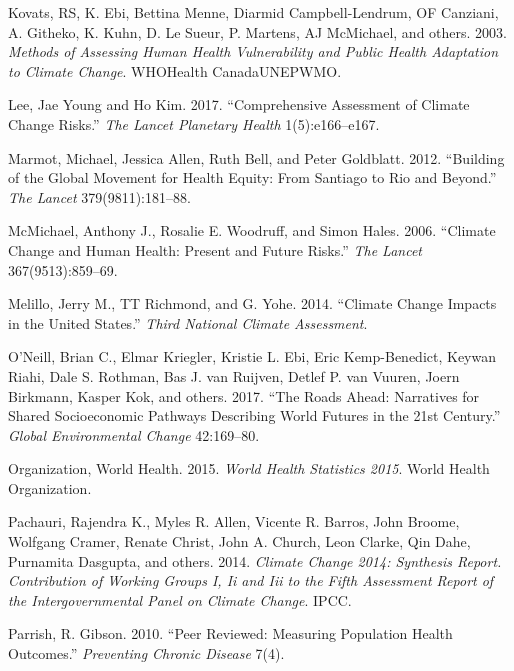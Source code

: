 \documentclass[12pt,]{article}
\begin{document}
\leavevmode\hypertarget{ref-kovats2003methods}{}%
Kovats, RS, K. Ebi, Bettina Menne, Diarmid Campbell-Lendrum, OF
Canziani, A. Githeko, K. Kuhn, D. Le Sueur, P. Martens, AJ McMichael,
and others. 2003. \emph{Methods of Assessing Human Health Vulnerability
and Public Health Adaptation to Climate Change}. WHOHealth
CanadaUNEPWMO.

\leavevmode\hypertarget{ref-lee2017comprehensive}{}%
Lee, Jae Young and Ho Kim. 2017. ``Comprehensive Assessment of Climate
Change Risks.'' \emph{The Lancet Planetary Health} 1(5):e166--e167.

\leavevmode\hypertarget{ref-marmot2012building}{}%
Marmot, Michael, Jessica Allen, Ruth Bell, and Peter Goldblatt. 2012.
``Building of the Global Movement for Health Equity: From Santiago to
Rio and Beyond.'' \emph{The Lancet} 379(9811):181--88.

\leavevmode\hypertarget{ref-mcmichael2006climate}{}%
McMichael, Anthony J., Rosalie E. Woodruff, and Simon Hales. 2006.
``Climate Change and Human Health: Present and Future Risks.'' \emph{The
Lancet} 367(9513):859--69.

\leavevmode\hypertarget{ref-melillo2014climate}{}%
Melillo, Jerry M., TT Richmond, and G. Yohe. 2014. ``Climate Change
Impacts in the United States.'' \emph{Third National Climate
Assessment}.

\leavevmode\hypertarget{ref-o2017roads}{}%
O'Neill, Brian C., Elmar Kriegler, Kristie L. Ebi, Eric Kemp-Benedict,
Keywan Riahi, Dale S. Rothman, Bas J. van Ruijven, Detlef P. van Vuuren,
Joern Birkmann, Kasper Kok, and others. 2017. ``The Roads Ahead:
Narratives for Shared Socioeconomic Pathways Describing World Futures in
the 21st Century.'' \emph{Global Environmental Change} 42:169--80.

\leavevmode\hypertarget{ref-world2015world}{}%
Organization, World Health. 2015. \emph{World Health Statistics 2015}.
World Health Organization.

\leavevmode\hypertarget{ref-pachauri2014climate}{}%
Pachauri, Rajendra K., Myles R. Allen, Vicente R. Barros, John Broome,
Wolfgang Cramer, Renate Christ, John A. Church, Leon Clarke, Qin Dahe,
Purnamita Dasgupta, and others. 2014. \emph{Climate Change 2014:
Synthesis Report. Contribution of Working Groups I, Ii and Iii to the
Fifth Assessment Report of the Intergovernmental Panel on Climate
Change}. IPCC.

\leavevmode\hypertarget{ref-parrish2010peer}{}%
Parrish, R. Gibson. 2010. ``Peer Reviewed: Measuring Population Health
Outcomes.'' \emph{Preventing Chronic Disease} 7(4).
\end{document}
